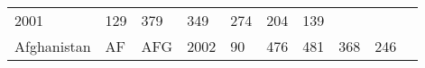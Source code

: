 \documentclass[]{article}
\begin{document}
\begin{longtable}[]{@{}llllllllll@{}}
\begin{minipage}[t]{0.04\columnwidth}
2001\strut
\end{minipage} & \begin{minipage}[t]{0.08\columnwidth}\raggedright\strut
129\strut
\end{minipage} & \begin{minipage}[t]{0.09\columnwidth}\raggedright\strut
379\strut
\end{minipage} & \begin{minipage}[t]{0.09\columnwidth}\raggedright\strut
349\strut
\end{minipage} & \begin{minipage}[t]{0.09\columnwidth}\raggedright\strut
274\strut
\end{minipage} & \begin{minipage}[t]{0.09\columnwidth}\raggedright\strut
204\strut
\end{minipage} & \begin{minipage}[t]{0.09\columnwidth}\raggedright\strut
139\strut
\end{minipage}\tabularnewline
\begin{minipage}[t]{0.08\columnwidth}\raggedright\strut
Afghanistan\strut
\end{minipage} & \begin{minipage}[t]{0.04\columnwidth}\raggedright\strut
AF\strut
\end{minipage} & \begin{minipage}[t]{0.04\columnwidth}\raggedright\strut
AFG\strut
\end{minipage} & \begin{minipage}[t]{0.04\columnwidth}\raggedright\strut
2002\strut
\end{minipage} & \begin{minipage}[t]{0.08\columnwidth}\raggedright\strut
90\strut
\end{minipage} & \begin{minipage}[t]{0.09\columnwidth}\raggedright\strut
476\strut
\end{minipage} & \begin{minipage}[t]{0.09\columnwidth}\raggedright\strut
481\strut
\end{minipage} & \begin{minipage}[t]{0.09\columnwidth}\raggedright\strut
368\strut
\end{minipage} & \begin{minipage}[t]{0.09\columnwidth}\raggedright\strut
246\strut
\end{minipage} & \begin{minipage}[t]{0.09\columnwidth}\raggedright\strut

\end{minipage}
\end{longtable}
\end{document}
